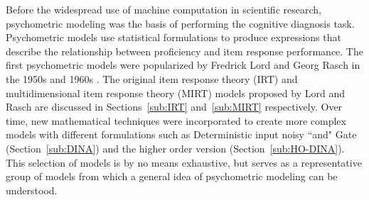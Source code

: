 \documentclass[letterpaper, 12pt, captions=tableabove]{scrreprt}
\begin{document}
		Before the widespread use of machine computation in scientific research, psychometric modeling was the basis of performing the cognitive diagnosis task. Psychometric models use statistical formulations to produce expressions that describe the relationship between proficiency and item response performance. The first psychometric models were popularized by Fredrick Lord and Georg Rasch in the 1950s and 1960s \cite{reckase2006}. The original item response theory (IRT) and multidimensional item response theory (MIRT) models proposed by Lord and Rasch are discussed in Sections~\ref{sub:IRT} and~\ref{sub:MIRT} respectively. Over time, new mathematical techniques were incorporated to create more complex models with different formulations such as Deterministic input noisy ``and" Gate (Section~\ref{sub:DINA}) and the higher order version (Section~\ref{sub:HO-DINA}). This selection of models is by no means exhaustive, but serves as a representative group of models from which a general idea of psychometric modeling can be understood.
\end{document}
